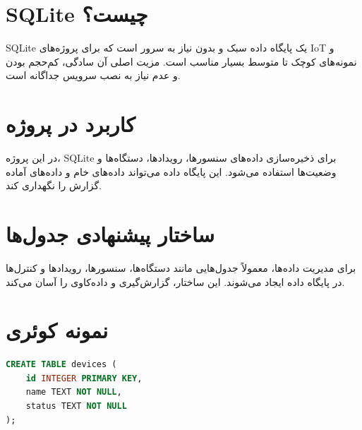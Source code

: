 \section{SQLite چیست؟}

SQLite یک پایگاه داده سبک و بدون نیاز به سرور است که برای پروژه‌های IoT و نمونه‌های کوچک تا متوسط بسیار مناسب است. مزیت اصلی آن سادگی، کم‌حجم بودن و عدم نیاز به نصب سرویس جداگانه است.

\section{کاربرد در پروژه}

در این پروژه، SQLite برای ذخیره‌سازی داده‌های سنسورها، رویدادها، دستگاه‌ها و وضعیت‌ها استفاده می‌شود. این پایگاه داده می‌تواند داده‌های خام و داده‌های آماده گزارش را نگهداری کند.

\section{ساختار پیشنهادی جدول‌ها}

برای مدیریت داده‌ها، معمولاً جدول‌هایی مانند دستگاه‌ها، سنسورها، رویدادها و کنترل‌ها در پایگاه داده ایجاد می‌شوند. این ساختار، گزارش‌گیری و داده‌کاوی را آسان می‌کند.

\section{نمونه کوئری}

\begin{lstlisting}[language=SQL]
CREATE TABLE devices (
    id INTEGER PRIMARY KEY,
    name TEXT NOT NULL,
    status TEXT NOT NULL
);
\end{lstlisting}
